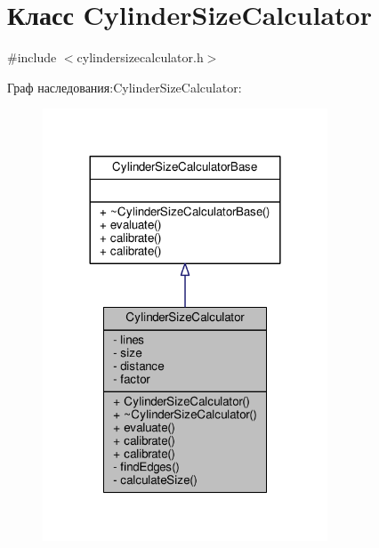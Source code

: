 \hypertarget{class_cylinder_size_calculator}{}\section{Класс Cylinder\+Size\+Calculator}
\label{class_cylinder_size_calculator}


{\ttfamily \#include $<$cylindersizecalculator.\+h$>$}



Граф наследования\+:Cylinder\+Size\+Calculator\+:
\nopagebreak
\begin{figure}[H]
\begin{center}
\leavevmode
\includegraphics[width=240pt]{da/d4d/class_cylinder_size_calculator__inherit__graph}
\end{center}
\end{figure}


